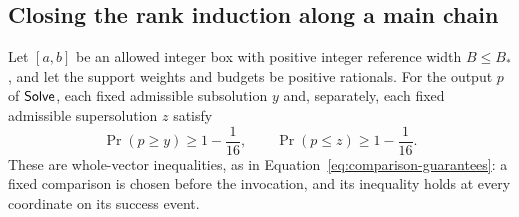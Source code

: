 \subsection{Closing the rank induction along a main chain}

\begin{theorem}
\label{thm:solve-comparisons}
Let \([a,b]\) be an allowed integer box with positive integer
reference width \(B\le B_*\), and let the support weights and
budgets be positive rationals. For the output \(p\) of \(\mathsf{Solve}\),
each fixed admissible subsolution \(y\) and, separately, each fixed
admissible supersolution \(z\) satisfy
\[
 \Pr(p\ge y)\ge 1-\frac1{16},
 \qquad
 \Pr(p\le z)\ge 1-\frac1{16}.
\]
These are whole-vector inequalities, as in
Equation~\eqref{eq:comparison-guarantees}: a fixed comparison is
chosen before the invocation, and its inequality holds at every
coordinate on its success event.
\end{theorem}

